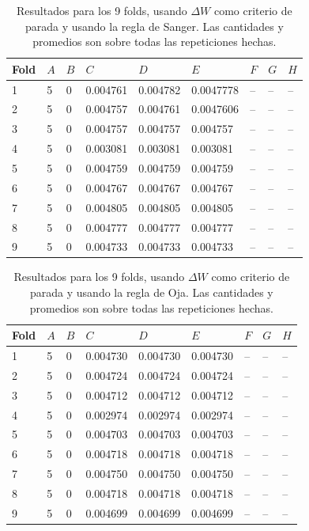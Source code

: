 \documentclass[informe.tex]{subfiles}
\begin{document}
	
	\begin{table}[H]
	  \centering
	  \begin{tabular}{|l|l|l|l|l|l|l|l|l|} \hline
	  Fold & $A$ & $B$ & $C$ & $D$ & $E$ & $F$ & $G$ & $H$ \\ \hline
	  1& 5 & 0 & 0.004761 & 0.004782 & 0.0047778 & -- & -- & -- \\ \hline
	  2& 5 & 0 & 0.004757 & 0.004761 & 0.0047606 & -- & -- & -- \\ \hline
	  3& 5 & 0 & 0.004757 & 0.004757 & 0.004757 & -- & -- & -- \\ \hline
	  4& 5 & 0 & 0.003081 & 0.003081 & 0.003081 & -- & -- & -- \\ \hline
	  5& 5 & 0 & 0.004759 & 0.004759 & 0.004759 & -- & -- & -- \\ \hline
	  6& 5 & 0 & 0.004767 & 0.004767 & 0.004767 & -- & -- & -- \\ \hline
	  7& 5 & 0 & 0.004805 & 0.004805 & 0.004805 & -- & -- & -- \\ \hline
	  8& 5 & 0 & 0.004777 & 0.004777 & 0.004777 & -- & -- & -- \\ \hline
	  9& 5 & 0 & 0.004733 & 0.004733 & 0.004733 & -- & -- & -- \\ \hline
	  \end{tabular}
	  \caption{Resultados para los 9 folds, usando $\Delta W$ como criterio de parada y usando la regla de Sanger. Las cantidades y promedios son sobre todas las repeticiones hechas.}
	  \label{tab:pesos_sanger250}
	\end{table}      
	

	\begin{table}[H]
	  \centering
	  \begin{tabular}{|l|l|l|l|l|l|l|l|l|} \hline
	  Fold & $A$ & $B$ & $C$ & $D$ & $E$ & $F$ & $G$ & $H$ \\ \hline
	  1& 5 & 0 & 0.004730 & 0.004730 & 0.004730 & -- & -- & -- \\ \hline
	  2& 5 & 0 & 0.004724 & 0.004724 & 0.004724 & -- & -- & -- \\ \hline
	  3& 5 & 0 & 0.004712 & 0.004712 & 0.004712 & -- & -- & -- \\ \hline
	  4& 5 & 0 & 0.002974 & 0.002974 & 0.002974 & -- & -- & -- \\ \hline
	  5& 5 & 0 & 0.004703 & 0.004703 & 0.004703 & -- & -- & -- \\ \hline
	  6& 5 & 0 & 0.004718 & 0.004718 & 0.004718 & -- & -- & -- \\ \hline
	  7& 5 & 0 & 0.004750 & 0.004750 & 0.004750 & -- & -- & -- \\ \hline
	  8& 5 & 0 & 0.004718 & 0.004718 & 0.004718 & -- & -- & -- \\ \hline
	  9& 5 & 0 & 0.004699 & 0.004699 & 0.004699 & -- & -- & -- \\ \hline
	  \end{tabular}
	  \caption{Resultados para los 9 folds, usando $\Delta W$ como criterio de parada y usando la regla de Oja. Las cantidades y promedios son sobre todas las repeticiones hechas.}
	  \label{tab:pesos_oja250}
	\end{table}
	
\end{document}
